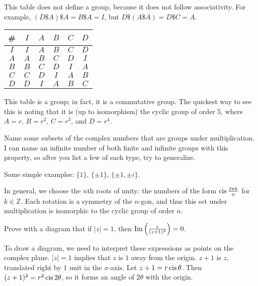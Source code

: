 \documentclass[../key.tex]{subfiles}
\begin{document}
This table does not define a group, because it does not follow associativity. For example, $(D \$ A) \$ A = B \$ A = I$, but $D \$ (A \$ A) = D \$ C = A$.

\begin{inner_problem}
\item \begin{tabular}{c|c|c|c|c|c|}
\# & $I$ & $A$ & $B$ & $C$ & $D$ \\ \hline
$I$ & $I$ & $A$ & $B$ & $C$ & $D$ \\ \hline
$A$ & $A$ & $B$ & $C$ & $D$ & $I$ \\ \hline
$B$ & $B$ & $C$ & $D$ & $I$ & $A$ \\ \hline
$C$ & $C$ & $D$ & $I$ & $A$ & $B$ \\ \hline
$D$ & $D$ & $I$ & $A$ & $B$ & $C$ \\ \hline
\end{tabular}
\end{inner_problem}

This table is a group; in fact, it is a commutative group. The quickest way to see this is noting that it is (up to isomorphism) the cyclic group of order $5$, where $A=r$, $B=r^2$, $C=r^3$, and $D=r^4$.

\begin{outer_problem}
\item Name some subsets of the complex numbers that are groups under multiplication. I can name an infinite number of both finite and infinite groups with this property, so after you list a few of each type, try to generalize.
\end{outer_problem}

Some simple examples: $\{1\}$, $\{\pm 1\}$, $\{\pm 1, \pm i\}$.

In general, we choose the $n$th roots of unity: the numbers of the form $\operatorname{cis} \frac{2\pi k}{n}$ for $k\in \mathbb{Z}$. Each rotation is a symmetry of the $n$-gon, and thus this set under multiplication is isomorphic to the cyclic group of order $n$.

\begin{outer_problem}
\item Prove with a diagram that if $|z|=1$, then $\operatorname{Im}\left(\frac{z}{(z+1)^2}\right)=0$.
\end{outer_problem}

To draw a diagram, we need to interpret these expressions as points on the complex plane. $|z|=1$ implies that $z$ is $1$ away from the origin. $z+1$ is $z$, translated right by $1$ unit in the $x$-axis. Let $z+1=r\operatorname{cis} \theta$. Then $(z+1)^2=r^2\operatorname{cis} 2\theta$, so it forms an angle of $2\theta$ with the origin.
\end{document}
